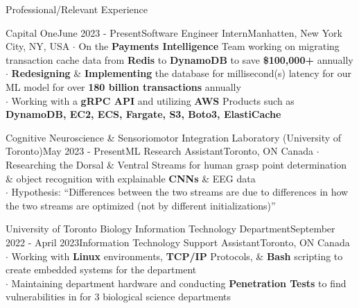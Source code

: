 \documentclass[UTF8]{resume} %
\begin{document}
\begin{rSection}{Professional/Relevant Experience}
\begin{rSubsection}{Capital One}{June 2023 - Present}{Software Engineer Intern}{Manhatten, New York City, NY, USA}
    $\cdot$ On the \textbf{Payments Intelligence} Team working on migrating transaction cache data from \textbf{Redis} to \textbf{DynamoDB} to save \textbf{\$100,000+} annually\\
    $\cdot$ \textbf{Redesigning} \& \textbf{Implementing} the database for millisecond(s) latency for our ML model for over \textbf{180 billion transactions} annually \\
    $\cdot$ Working with a \textbf{gRPC API} and utilizing \textbf{AWS} Products such as \textbf{DynamoDB, EC2, ECS, Fargate, S3, Boto3, ElastiCache} 
\end{rSubsection}
\begin{rSubsection}{Cognitive Neuroscience \& Sensoriomotor Integration Laboratory (University of Toronto)}{May 2023 - Present}{ML Research Assistant}{Toronto, ON Canada}
    $\cdot$ Researching the Dorsal \& Ventral Streams for human grasp point determination \& object recognition with explainable \textbf{CNNs} \& EEG data\\
    $\cdot$ Hypothesis: “Differences between the two streams are due to differences in how the two streams are optimized (not by different initializations)”
\end{rSubsection}
\begin{rSubsection}{University of Toronto Biology Information Technology Department}{September 2022 - April 2023}{Information Technology Support Assistant}{Toronto, ON Canada}
    $\cdot$ Working with \textbf{Linux} environments, \textbf{TCP/IP} Protocols, \& \textbf{Bash} scripting to create embedded systems for the department \\
    $\cdot$ Maintaining department hardware and conducting \textbf{Penetration Tests} to find vulnerabilities in for 3 biological science departments
\end{rSubsection}

\end{rSection}
\end{document}
